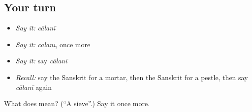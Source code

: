 \subsection*{Your turn}
\begin{itemize}
\raggedright
  \item \emph{Say it:} \emph{cālanī}
  \item \emph{Say it:} \emph{cālanī}, once more
  \item \emph{Say it:} say \emph{cālanī}
  \item \emph{Recall:} say the Sanskrit for a mortar, then the Sanskrit for a pestle, then say \emph{cālanī} again
\end{itemize}

\begin{tcolorbox}[breakable,colback=teal!4,colframe=teal!35!black,title={Before you move on}]
What does  mean? (\textquotedblleft{}A sieve\textquotedblright{}.) Say it once more.
\end{tcolorbox}
